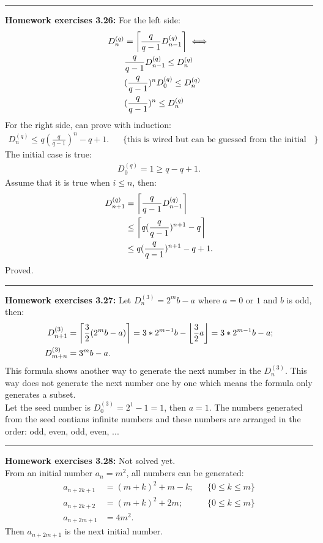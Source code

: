 \documentclass{article}
\DeclarePairedDelimiter\ceil{\lceil}{\rceil}
\DeclarePairedDelimiter\floor{\lfloor}{\rfloor}
\begin{document}
\noindent\rule{\textwidth}{0.4pt}
\textbf{Homework exercises 3.26:}
For the left side:
\begin{align}
D_n^{(q)} &= \ceil*{\frac{q}{q-1} D_{n-1}^{(q)}} \iff\\
	  & \frac{q}{q-1} D_{n-1}^{(q)} \le D_n^{(q)} \\
	  & (\frac{q}{q-1})^n D_{0}^{(q)} \le D_n^{(q)} \\
	  & (\frac{q}{q-1})^n  \le D_n^{(q)} \
\end{align}
For the right side, can prove with induction:
\begin{align}
D_n^{(q)} \le q(\frac{q}{q-1})^n - q + 1. &&\{\text{this is wired but can be guessed from the initial case.}\}
\end{align}
The initial case is true:
\begin{align}
D_0^{(q)}  = 1 \ge q - q + 1.
\end{align}
Assume that it is true when $i \le n$, then:
\begin{align}
D_{n+1}^{(q)} &= \ceil*{\frac{q}{q-1} D_{n-1}^{(q)}} \\
	      &\le \ceil*{q(\frac{q}{q-1})^{n+1} - q} \\
	      &\le q(\frac{q}{q-1})^{n+1} - q + 1.
\end{align}
Proved.

\noindent\rule{\textwidth}{0.4pt}
\textbf{Homework exercises 3.27:}
Let $D_n^{(3)} = 2^m b - a$ where $a = 0\text{ or }1$ and $b$ is odd, then:
\begin{align}
D_{n+1}^{(3)} &= \ceil*{\frac{3}{2} (2^m b - a)} = 3 * 2^{m-1} b - \floor*{\frac{3}{2}a} = 3 * 2^{m-1} b  - a; \\
D_{m+n}^{(3)} &= 3^m b - a.
\end{align}
This formula shows another way to generate the next number in the $D_n^{(3)}$.
This way does not generate the next number one by one which means the formula only generates a subset.\\
Let the seed number is $D_0^{(3)} = 2^1 - 1 = 1$, then $a=1$.
The numbers generated from the seed contians infinite numbers and these numbers are arranged in the order: odd, even, odd, even, ...

\noindent\rule{\textwidth}{0.4pt}
\textbf{Homework exercises 3.28:}
Not solved yet.\\
From an initial number $a_n = m^2$, all numbers can be generated:
\begin{align}
a_{n + 2k + 1} &= (m+k)^2 + m - k; && \{0 \le k \le m \} \\
a_{n + 2k + 2} &= (m+k)^2 + 2m; && \{0 \le k \le m \} \\
a_{n + 2m + 1} &= 4m^2.
\end{align}
Then $a_{n + 2m + 1}$ is the next initial number.
\end{document}
